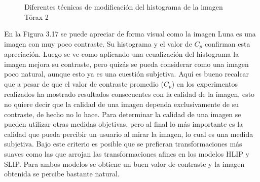 \begin{figure}
\begin{center}
		\caption{Diferentes t\'ecnicas de modificaci\'on del histograma de la imagen T\'orax 2}
	\end{center}
\end{figure}

En la Figura 3.17 se puede apreciar de forma visual como la imagen Luna es una imagen con muy poco contraste. Su histograma y el valor de $C_p$ confirman esta apreciaci\'on. Luego se ve como aplicando una ecualizaci\'on del histograma la imagen mejora su contraste, pero quiz\'as se pueda considerar como una imagen poco natural, aunque esto ya es una cuesti\'on subjetiva. Aqu\'i es bueno recalcar que a pesar de que el valor de contraste promedio ($C_p$) en los experimentos realizados ha mostrado resultados consecuentes con la calidad de la imagen, esto no quiere decir que la calidad de una imagen dependa exclusivamente de su contraste, de hecho no lo hace. Para determinar la calidad de una imagen se pueden utilizar otras medidas objetivas, pero al final lo m\'as importante es la calidad que pueda percibir un usuario al mirar la imagen, lo cual es una medida subjetiva. Bajo este criterio es posible que se prefieran transformaciones m\'as suaves como las que arrojan las transformaciones afines en los modelos HLIP y SLIP. Para ambos modelos se obtiene un buen valor de contraste y la imagen obtenida se percibe bastante natural.

